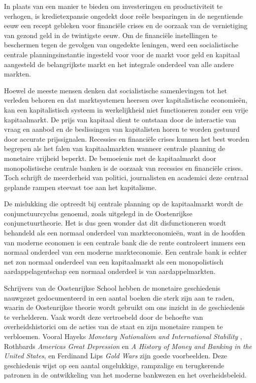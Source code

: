In plaats van een manier te bieden om investeringen en productiviteit te verhogen, is kredietexpansie ongedekt door reële besparingen in de negentiende eeuw een recept gebleken voor financiële crises en de oorzaak van de vernietiging van gezond geld in de twintigste eeuw. Om de financiële instellingen te beschermen tegen de gevolgen van ongedekte leningen, werd een socialistische centrale planningsinstantie ingesteld voor voor de markt voor geld en kapitaal aangesteld de belangrijkste markt en het integrale onderdeel van alle andere markten.

Hoewel de meeste mensen denken dat socialistische samenlevingen tot het verleden behoren en dat marktsystemen heersen over kapitalistische economieën, kan een kapitalistisch systeem in werkelijkheid niet functioneren zonder een vrije kapitaalmarkt. De prijs van kapitaal dient te ontstaan door de interactie van vraag en aanbod en de beslissingen van kapitalisten horen te worden gestuurd door accurate prijssignalen. Recessies en financiële crises kunnen het best worden begrepen als het falen van kapitaalmarkten wanneer centrale planning de monetaire vrijheid beperkt. De bemoeienis met de kapitaalmarkt door monopolistische centrale banken is de oorzaak van recessies en financiële crises. Toch schrijft de meerderheid van politici, journalisten en academici deze centraal geplande rampen steevast toe aan het kapitalisme.

De mislukking die optreedt bij centrale planning op de kapitaalmarkt wordt de conjunctuurcyclus genoemd, zoals uitgelegd in de Oostenrijkse conjunctuurtheorie. Het is dus geen wonder dat dit disfunctioneren wordt behandeld als een normaal onderdeel van markteconomieën, want in de hoofden van moderne economen is een centrale bank die de rente controleert immers een normaal onderdeel van een moderne markteconomie. Een centrale bank is echter net zo\textquotesingle n normaal onderdeel van een kapitaalmarkt als een monopolistisch aardappelagentschap een normaal onderdeel is van aardappelmarkten.

Schrijvers van de Oostenrijkse School hebben de monetaire geschiedenis nauwgezet gedocumenteerd in een aantal boeken die sterk zijn aan te raden, waarin de Oostenrijkse theorie wordt gebruikt om ons inzicht in de geschiedenis te verhelderen. Vaak wordt deze vertroebeld door de behoefte van overheidshistorici om de acties van de staat en zijn monetaire rampen te verbloemen. Vooral Hayek\textquotesingle s \emph{Monetary Nationalism and International Stability} , Rothbard\textquotesingle s \emph{America\textquotesingle s Great Depression} en \emph{A History of Money and Banking in the United States}, en Ferdinand Lips\textquotesingle{} \emph{Gold Wars} zijn goede voorbeelden. Deze geschiedenis wijst op een aantal ongelukkige, rampzalige en terugkerende patronen in de ontwikkeling van het moderne bankwezen en het overheidsbeleid.

